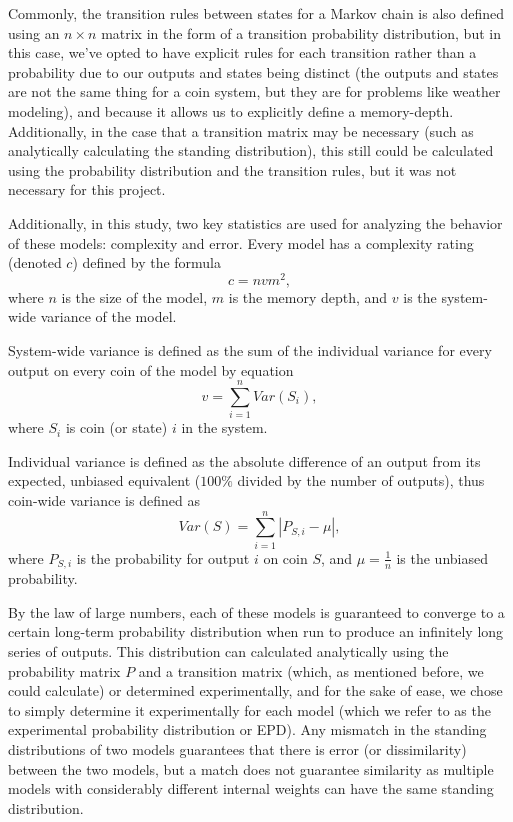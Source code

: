 \documentclass{article}
\begin{document}
Commonly, the transition rules between states for a Markov chain is also defined using an $n \times n$ matrix in the form of a transition probability distribution, but in this case, we've opted to have explicit rules for each transition rather than a probability due to our outputs and states being distinct (the outputs and states are not the same thing for a coin system, but they are for problems like weather modeling), and because it allows us to explicitly define a memory-depth. Additionally, in the case that a transition matrix may be necessary (such as analytically calculating the standing distribution), this still could be calculated using the probability distribution and the transition rules, but it was not necessary for this project.

Additionally, in this study, two key statistics are used for analyzing the behavior of these models: complexity and error. Every model has a complexity rating (denoted $c$) defined by the formula
\begin{equation}\label{eq:complexity}
c = nvm^2,
\end{equation}
where $n$ is the size of the model, $m$ is the memory depth, and $v$ is the system-wide variance of the model. 

System-wide variance is defined as the sum of the individual variance for every output on every coin of the model by equation
\begin{equation}\label{eq:sw-variance}
    v = \sum_{i=1}^{n} Var(S_{i}),
\end{equation}
where $S_{i}$ is coin (or state) $i$ in the system.

Individual variance is defined as the absolute difference of an output from its expected, unbiased equivalent ($100\%$ divided by the number of outputs), thus coin-wide variance is defined as
\begin{equation}\label{eq:ind-variance}
    Var(S) = \sum_{i=1}^{n} |P_{S,i} - \mu|,
\end{equation}
where $P_{S,i}$ is the probability for output $i$ on coin $S$, and $\mu = \frac{1}{n}$ is the unbiased probability.

By the law of large numbers, each of these models is guaranteed to converge to a certain long-term probability distribution when run to produce an infinitely long series of outputs. This distribution can calculated analytically using the probability matrix $P$ and a transition matrix (which, as mentioned before, we could calculate) or determined experimentally, and for the sake of ease, we chose to simply determine it experimentally for each model (which we refer to as the experimental probability distribution or EPD). Any mismatch in the standing distributions of two models guarantees that there is error (or dissimilarity) between the two models, but a match does not guarantee similarity as multiple models with considerably different internal weights can have the same standing distribution.
\end{document}
